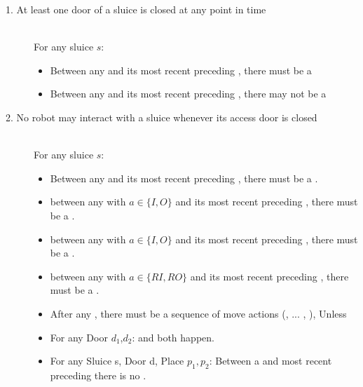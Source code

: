 
\begin{description}
 \item[1. At least one door of a sluice is closed at any point in time] \hfill \\
 For any sluice $s$:
 \begin{itemize}
  \item Between any  and its most recent preceding , there must be a 
  \item Between any  and its most recent preceding , there may not be a 
 \end{itemize}

 \item[2. No robot may interact with a sluice whenever its access door is closed] \hfill \\
For any sluice $s$:

\begin{itemize}
	\item Between any  and its most recent preceding , there must be a .
	\item between any  with $a \in \{ I, O \}$ and its most recent preceding , there must be a .
	\item between any  with $a \in \{ I, O \}$ and its most recent preceding , there must be a .
	\item between any  with $a \in \{ RI, RO \}$ and its most recent preceding , there must be a .
\end{itemize}
 
 \item[] \hfill 
 \begin{itemize}
 \item After any , there must be a sequence of move actions (, ... , ),
 Unless\\
 \item For any Door $d_1$,$d_2$:  and  both happen.
 \item For any Sluice s, Door d, Place $p_1,p_2$: Between a  and most recent preceding  there is no . 
 \end{itemize}
 

\end{description}
